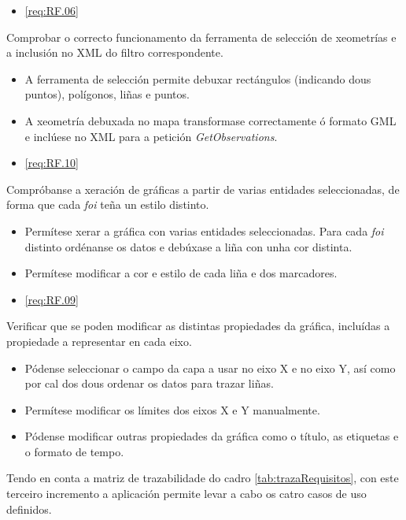 		  {\begin{itemize}\item \ref{req:RF.06} \\\end{itemize}} %
		  {Comprobar o correcto funcionamento da ferramenta de selección de xeometrías e a inclusión no XML do filtro correspondente.} %
		  {\begin{itemize}
		  \item A ferramenta de selección permite debuxar rectángulos (indicando dous puntos), polígonos, liñas e puntos.
		  \item A xeometría debuxada no mapa transformase correctamente ó formato GML e inclúese no XML para a petición \emph{GetObservations}.
		  \end{itemize}} %
\newpage		  
{}
		  {\begin{itemize}\item \ref{req:RF.10} \\\end{itemize}} %
		  {Compróbanse a xeración de gráficas a partir de varias entidades seleccionadas, de forma que cada \emph{foi} teña un estilo distinto.} %
		  {\begin{itemize}
		  \item Permítese xerar a gráfica con varias entidades seleccionadas. Para cada \emph{foi} distinto ordénanse os datos e debúxase a liña con unha cor distinta.
		  \item Permítese modificar a cor e estilo de cada liña e dos marcadores.
		  \end{itemize}} %
		  
		  {\begin{itemize}\item \ref{req:RF.09} \\\end{itemize}} %
		  {Verificar que se poden modificar as distintas propiedades da gráfica, incluídas a propiedade a representar en cada eixo.} %
		  {\begin{itemize}
		  \item Pódense seleccionar o campo da capa a usar no eixo X e no eixo Y, así como por cal dos dous ordenar os datos para trazar liñas.
		  \item Permítese modificar os límites dos eixos X e Y manualmente.
		  \item Pódense modificar outras propiedades da gráfica como o título, as etiquetas e o formato de tempo.
		  \end{itemize}} %
		  
Tendo en conta a matriz de trazabilidade do cadro \ref{tab:trazaRequisitos}, con este terceiro incremento a aplicación permite levar a cabo os catro casos de uso definidos.
